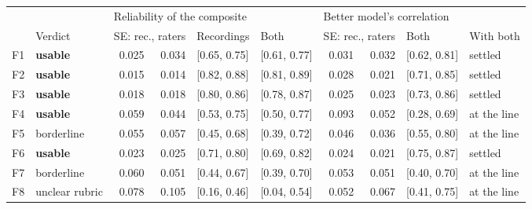 {\scriptsize\setlength{\tabcolsep}{3.2pt}
\begin{tabular}{@{}l l rr l l rr l l@{}}
\toprule
 & & \multicolumn{4}{l}{Reliability of the composite} & \multicolumn{3}{l}{Better model's correlation} & \\
\cmidrule(r){3-6}\cmidrule(r){7-9}
 & Verdict & \multicolumn{2}{l}{SE: rec., raters} & Recordings & Both & \multicolumn{2}{l}{SE: rec., raters} & Both & With both \\
\midrule
F1 & \textbf{usable} & 0.025 & 0.034 & {\scriptsize[0.65, 0.75]} & {\scriptsize[0.61, 0.77]} & 0.031 & 0.032 & {\scriptsize[0.62, 0.81]} & settled \\
F2 & \textbf{usable} & 0.015 & 0.014 & {\scriptsize[0.82, 0.88]} & {\scriptsize[0.81, 0.89]} & 0.028 & 0.021 & {\scriptsize[0.71, 0.85]} & settled \\
F3 & \textbf{usable} & 0.018 & 0.018 & {\scriptsize[0.80, 0.86]} & {\scriptsize[0.78, 0.87]} & 0.025 & 0.023 & {\scriptsize[0.73, 0.86]} & settled \\
F4 & \textbf{usable} & 0.059 & 0.044 & {\scriptsize[0.53, 0.75]} & {\scriptsize[0.50, 0.77]} & 0.093 & 0.052 & {\scriptsize[0.28, 0.69]} & at the line \\
F5 & borderline & 0.055 & 0.057 & {\scriptsize[0.45, 0.68]} & {\scriptsize[0.39, 0.72]} & 0.046 & 0.036 & {\scriptsize[0.55, 0.80]} & at the line \\
F6 & \textbf{usable} & 0.023 & 0.025 & {\scriptsize[0.71, 0.80]} & {\scriptsize[0.69, 0.82]} & 0.024 & 0.021 & {\scriptsize[0.75, 0.87]} & settled \\
F7 & borderline & 0.060 & 0.051 & {\scriptsize[0.44, 0.67]} & {\scriptsize[0.39, 0.70]} & 0.053 & 0.051 & {\scriptsize[0.40, 0.70]} & at the line \\
F8 & unclear rubric & 0.078 & 0.105 & {\scriptsize[0.16, 0.46]} & {\scriptsize[0.04, 0.54]} & 0.052 & 0.067 & {\scriptsize[0.41, 0.75]} & at the line \\
\bottomrule
\end{tabular}}
